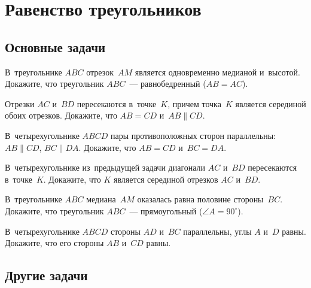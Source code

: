 

\section*{Равенство треугольников}


\subsection*{Основные задачи}

\begin{problems}

\item
В~треугольнике $ABC$ отрезок~$AM$ является одновременно медианой и~высотой.
Докажите, что треугольник $ABC$~--- равнобедренный ($AB = AC$).

\item
Отрезки $AC$ и~$BD$ пересекаются в~точке~$K$, причем точка~$K$ является
серединой обоих отрезков.
Докажите, что $AB = CD$ и~$AB \parallel CD$.

\item
В~четырехугольнике $ABCD$ пары противоположных сторон параллельны:
$AB \parallel CD$, $BC \parallel DA$.
Докажите, что $AB = CD$ и~$BC = DA$.

\item
В~четырехугольнике из~предыдущей задачи диагонали $AC$ и~$BD$ пересекаются
в~точке~$K$.
Докажите, что $K$ является серединой отрезков $AC$ и~$BD$.

\item
В~треугольнике $ABC$ медиана~$AM$ оказалась равна половине стороны~$BC$.
Докажите, что треугольник $ABC$~--- прямоугольный ($\angle A = 90^{\circ}$).

\item
В~четырехугольнике $ABCD$ стороны $AD$ и~$BC$ параллельны, углы $A$ и~$D$
равны.
Докажите, что его стороны $AB$ и~$CD$ равны.

\end{problems}

\subsection*{Другие задачи}

